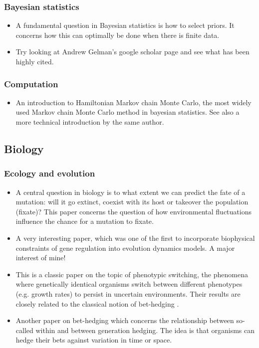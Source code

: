\documentclass{amsart}
\begin{document}
\subsubsection{Bayesian statistics}
\begin{itemize}
\item \cite{Mattingly2018} A fundamental question in Bayesian statistics is how to select priors. It concerns how this can optimally be done when there is finite data. 
\item Try looking at Andrew Gelman's google scholar page and see what has been highly cited. 
\end{itemize}


\subsubsection{Computation}

\begin{itemize}
\item \cite{Betancourt2017aa} An introduction to Hamiltonian Markov chain Monte Carlo, the most widely used Markov chain Monte Carlo method in bayesian statistics. See also a more technical introduction by the same author.
\end{itemize}

\subsection{Biology}

\subsubsection{Ecology and evolution}

\begin{itemize}
\item \cite{cvijovi2015} A central question in biology is to what extent we can predict the fate of a mutation: will it go extinct, coexist with its host or takeover the population (fixate)? This paper concerns the question of how environmental fluctuations influence the chance for a mutation to fixate.
\item \cite{lassig2007}  A very interesting paper, which was one of the first to incorporate biophysical constraints of gene regulation into evolution dynamics models. A major interest of mine! 
\item \cite{kussell2005b} This is a classic paper on the topic of phenotypic switching, the phenomena where genetically identical organisms switch between different phenotypes (e.g. growth rates) to persist in uncertain environments. Their results are closely related to the classical notion of bet-hedging \cite{kelly1956}. 
\item \cite{schreiber2015} Another paper on bet-hedging which concerns the relationship between so-called within and between generation hedging. The idea is that organisms can hedge their bets against variation in time or space. 
\end{itemize}
\end{document}
